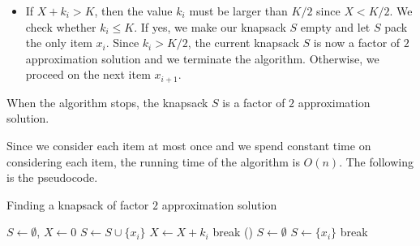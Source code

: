 \documentclass[11pt]{article}
\begin{document}
\begin{enumerate}
\begin{itemize}
\item
	If $X+k_i>K$, then the value
    $k_i$ must be larger than $K/2$ since $X<K/2$. We check whether
	$k_i\leq K$. If yes, we make our
	knapsack $S$ empty and let $S$ pack the only item $x_i$.
	Since $k_i> K/2$, the current knapsack $S$ is now a factor of $2$ approximation solution and we terminate the algorithm. Otherwise, we proceed on the next item $x_{i+1}$.
\end{itemize}

When the algorithm stops, the knapsack $S$ is a factor of $2$
approximation solution.

Since we consider each item at most once and we spend constant time on
considering each item, the running time of the algorithm is $O(n)$.
The following is the pseudocode.
	

\begin{algorithm}[h]
	\caption{Finding a knapsack of factor $2$ approximation solution}
	\label{algo:case3}
	\SetAlgoNoLine
	 \BlankLine
	$S\leftarrow\emptyset$,
	$X\leftarrow 0$\;
	{
		{
			$S\leftarrow S\cup\{x_i\}$\;
			$X\leftarrow X+k_i$\;
			{
				break
			}
	    }
        ()
		{
				{
					$S\leftarrow \emptyset$ 
					$S\leftarrow \{x_i\}$\;
					break
			     }
			}
	}
\end{algorithm}

\end{enumerate}
\end{document}
